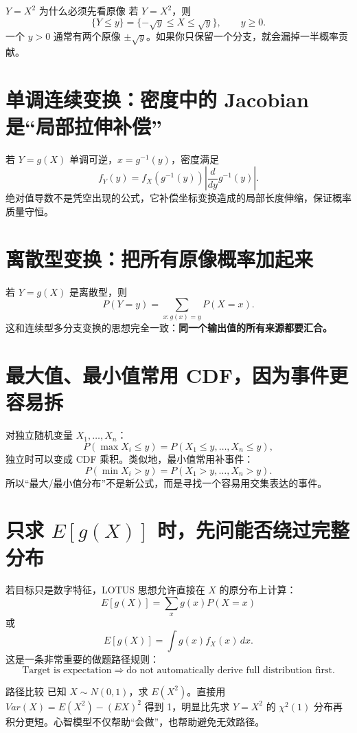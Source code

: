\documentclass[11pt,a4paper,openany]{ctexbook}
\newcommand{\key}[1]{\textbf{\color{deep}#1}}
\begin{document}
\begin{examplebox}{$Y=X^2$ 为什么必须先看原像}
若 $Y=X^2$，则
\[
\{Y\le y\}=\{-\sqrt y\le X\le \sqrt y\},\qquad y\ge0.
\]
一个 $y>0$ 通常有两个原像 $\pm\sqrt y$。如果你只保留一个分支，就会漏掉一半概率贡献。
\end{examplebox}

\section{单调连续变换：密度中的 Jacobian 是“局部拉伸补偿”}
若 $Y=g(X)$ 单调可逆，$x=g^{-1}(y)$，密度满足
\[
f_Y(y)=f_X(g^{-1}(y))\left\lvert\frac{d}{dy}g^{-1}(y)\right\rvert.
\]
绝对值导数不是凭空出现的公式，它补偿坐标变换造成的局部长度伸缩，保证概率质量守恒。

\section{离散型变换：把所有原像概率加起来}
若 $Y=g(X)$ 是离散型，则
\[
P(Y=y)=\sum_{x:g(x)=y}P(X=x).
\]
这和连续型多分支变换的思想完全一致：\key{同一个输出值的所有来源都要汇合。}

\section{最大值、最小值常用 CDF，因为事件更容易拆}
对独立随机变量 $X_1,\dots,X_n$：
\[
P(\max X_i\le y)=P(X_1\le y,\dots,X_n\le y),
\]
独立时可以变成 CDF 乘积。类似地，最小值常用补事件：
\[
P(\min X_i>y)=P(X_1>y,\dots,X_n>y).
\]
所以“最大/最小值分布”不是新公式，而是寻找一个容易用交集表达的事件。

\section{只求 \texorpdfstring{$E[g(X)]$}{E[g(X)]} 时，先问能否绕过完整分布}
若目标只是数字特征，LOTUS 思想允许直接在 $X$ 的原分布上计算：
\[
E[g(X)]=\sum_xg(x)P(X=x)
\]
或
\[
E[g(X)]=\int g(x)f_X(x)\,dx.
\]
这是一条非常重要的做题路径规则：
\[
\boxed{\text{Target is expectation}\Rightarrow\text{do not automatically derive full distribution first}.}
\]

\begin{examBox}{路径比较}
已知 $X\sim N(0,1)$，求 $E(X^2)$。直接用 $Var(X)=E(X^2)-(EX)^2$ 得到 1，明显比先求 $Y=X^2$ 的 $\chi^2(1)$ 分布再积分更短。心智模型不仅帮助“会做”，也帮助避免无效路径。
\end{examBox}

\end{document}
